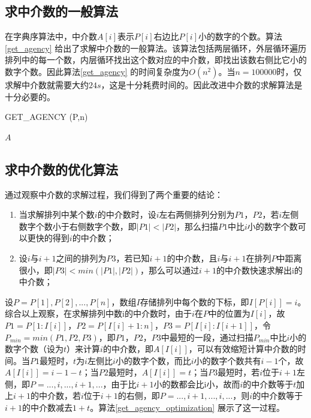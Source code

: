 \documentclass[6pt, twocolumn]{ctexart}
\begin{document}
\subsection{求中介数的一般算法}
在字典序算法中，中介数$A[i]$表示$P[i]$右边比$P[i]$小的数字的个数。算法\ref{get_agency} 给出了求解中介数的一般算法。该算法包括两层循环，外层循环遍历排列中的每一个数，内层循环找出这个数对应的中介数，即找出该数右侧比它小的数字个数。因此算法\ref{get_agency} 的时间复杂度为$O(n^2)$。当$n=100000$时，仅求解中介数就需要大约$24s$，这是十分耗费时间的。因此改进中介数的求解算法是十分必要的。

\begin{algorithm}
\caption{GET\_AGENCY (P,n)}
\label{get_agency}
\begin{algorithmic}[1]
\ENDIF
\ENDFOR
\ENDFOR
\RETURN $A$
\end{algorithmic}
\end{algorithm}



\subsection{求中介数的优化算法}
通过观察中介数的求解过程，我们得到了两个重要的结论：
\begin{enumerate}
  \item 当求解排列中某个数$i$的中介数时，设$i$左右两侧排列分别为$P1$，$P2$，若$i$左侧数字个数小于右侧数字个数，即$|P1|<|P2|$，那么扫描$P1$中比$i$小的数字个数可以更快的得到$i$的中介数；
  \item 设$i$与$i+1$之间的排列为$P3$，若已知$i+1$的中介数，且$i$与$i+1$在排列$P$中距离很小，即$|P3|<min(|P1|,|P2|)$，那么可以通过$i+1$的中介数快速求解出i的中介数；
\end{enumerate}
设$P=P[1],P[2],...,P[n]$，数组$I$存储排列中每个数的下标，即$I[P[i]]=i$。综合以上观察，在求解排列中数i的中介数时，由于$i$在$P$中的位置为$I[i]$，故$P1=P[1:I[i]]$，$P2=P[I[i]+1:n]$，$P3=P[I[i]:I[i+1]]$，令$P_{min}=min(P1,P2,P3)$，即$P1$，$P2$，$P3$中最短的一段，通过扫描$P_{min}$中比$i$小的数字个数（设为$t$）来计算$i$的中介数，即$A[I[i]]$，可以有效缩短计算中介数的时间。当$P1$最短时，$t$为$i$左侧比$i$小的数字个数，而比$i$小的数字个数共有$i-1$个，故$A[I[i]]=i-1-t$；当$P2$最短时，$A[I[i]]=t$；当$P3$最短时，若$i$位于$i+1$左侧，即$P=...,i,...,i+1,...$，由于比$i+1$小的数都会比i小，故而$i$的中介数等于$t$加上$i+1$的中介数，若$i$位于$i+1$的右侧，即$P=...,i+1,...,i,...$，则$i$的中介数等于$i+1$的中介数减去$1+t$。算法\ref{get_agency_optimization} 展示了这一过程。
\end{document}
